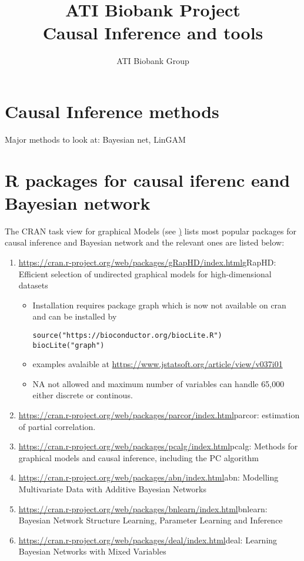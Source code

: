 \documentclass{article}
\begin{document}
\title{ATI Biobank Project \\ Causal Inference and tools}

\author{ATI Biobank Group}

\maketitle

\section{Causal Inference methods}
Major methods to look at: Bayesian net, LinGAM
\section{R packages for causal iferenc eand Bayesian network}
The CRAN task view for graphical Models (see \href{https://cran.r-project.org/web/views/gR.html}) lists most popular packages for causal inference and Bayesian network and the relevant ones are listed below:

\begin{enumerate}
\item \url{https://cran.r-project.org/web/packages/gRapHD/index.html}{gRapHD}: Efficient selection of undirected graphical models for high-dimensional datasets
\begin{itemize}
\item Installation requires package graph which is now not available on cran and can be installed by 
\begin{verbatim}
source("https://bioconductor.org/biocLite.R")
biocLite("graph")
\end{verbatim}
\item examples avalaible at \url{https://www.jstatsoft.org/article/view/v037i01}
\item NA not allowed and maximum number of variables can handle 65,000 either discrete or continous.

\end{itemize}
\item \url{https://cran.r-project.org/web/packages/parcor/index.html}{parcor}: estimation of partial correlation.
\item \url{https://cran.r-project.org/web/packages/pcalg/index.html}{pcalg}: Methods for graphical models and causal inference, including the PC algorithm 
\item \url{https://cran.r-project.org/web/packages/abn/index.html}{abn}: Modelling Multivariate Data with Additive Bayesian Networks
\item \url{https://cran.r-project.org/web/packages/bnlearn/index.html}{bnlearn}: Bayesian Network Structure Learning, Parameter Learning and Inference
\item \url{https://cran.r-project.org/web/packages/deal/index.html}{deal}: Learning Bayesian Networks with Mixed Variables

\end{enumerate}
\end{document}
